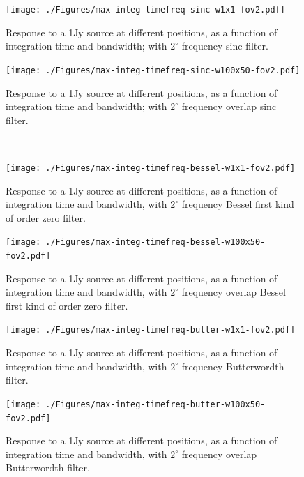 \documentclass[useAMS,usenatbib]{mn2e}
\begin{document}
\begin{figure}
  \centering
\begin{minipage}{0.38\linewidth}\texttt{[image: ./Figures/max-integ-timefreq-sinc-w1x1-fov2.pdf]}
    \caption{Response to a 1Jy source at different positions, as a function of integration time and bandwidth; with $2^{\circ}$ frequency 
sinc filter.}
    \label{fig:max-integ-timefreq-sinc-w1x1-fov2}\end{minipage}
 \hspace{1cm}
\begin{minipage}{0.38\linewidth}\texttt{[image: ./Figures/max-integ-timefreq-sinc-w100x50-fov2.pdf]}
    \caption{Response to a 1Jy source at different positions, as a function of integration time and bandwidth; with $2^{\circ}$ frequency 
 overlap sinc filter.}
    \label{fig:max-integ-timefreq-sinc-w100x50-fov2}\end{minipage}\\
\begin{minipage}{0.38\linewidth}\texttt{[image: ./Figures/max-integ-timefreq-bessel-w1x1-fov2.pdf]}
      \caption{Response to a 1Jy source at different positions, as a function of integration time and bandwidth, with $2^{\circ}$ frequency 
Bessel first kind of order zero filter.}
      \label{fig:max-integ-timefreq-bessel-w1x1-fov2}\end{minipage}
\hspace{1cm}
\begin{minipage}{0.38\linewidth}\texttt{[image: ./Figures/max-integ-timefreq-bessel-w100x50-fov2.pdf]}
      \caption{Response to a 1Jy source at different positions, as a function of integration time and bandwidth, with $2^{\circ}$ frequency 
overlap Bessel first kind of order zero filter.}
  \label{fig:max-integ-timefreq-bessel-w100x50-fov2}\end{minipage}
\begin{minipage}{0.38\linewidth}\texttt{[image: ./Figures/max-integ-timefreq-butter-w1x1-fov2.pdf]}
      \caption{Response to a 1Jy source at different positions, as a function of integration time and bandwidth, with $2^{\circ}$ frequency 
Butterwordth filter.}
      \label{fig:max-integ-timefreq-butter-w1x1-fov2}\end{minipage}
\hspace{1cm}
\begin{minipage}{0.38\linewidth}\texttt{[image: ./Figures/max-integ-timefreq-butter-w100x50-fov2.pdf]}
      \caption{Response to a 1Jy source at different positions, as a function of integration time and bandwidth, with $2^{\circ}$ frequency 
overlap Butterwordth filter.}
  \label{fig:max-integ-timefreq-butter-w100x50-fov2}\end{minipage}
\end{figure}
\end{document}
